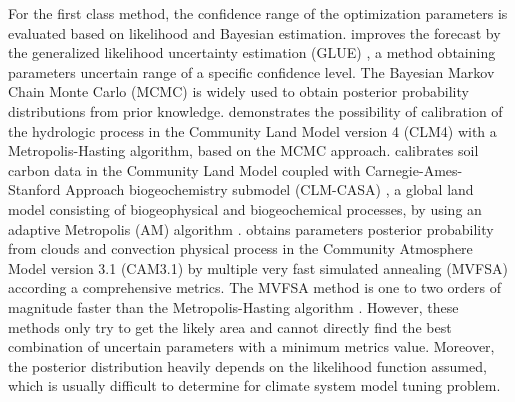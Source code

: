 \documentclass[gmd, manuscript]{copernicus}
\begin{document}
For the first class method, the confidence range of the optimization parameters is evaluated based on likelihood and Bayesian estimation. \cite{cameron1999flood} improves the forecast by the generalized likelihood uncertainty estimation (GLUE) \citep{beven1992future}, a method obtaining parameters uncertain range of a specific confidence level. The Bayesian Markov Chain Monte Carlo (MCMC) \citep{gilks2005markov} is widely used to obtain posterior probability distributions from prior knowledge. \cite{sun2013inverse} demonstrates the possibility of calibration of the hydrologic process in the Community Land Model version 4 (CLM4) \citep{lawrence2011parameterization,lawrence2007representing} with a Metropolis-Hasting algorithm, based on the MCMC approach. \cite{hararuk2014evaluation} calibrates soil carbon data in the  Community Land Model coupled with Carnegie-Ames-Stanford Approach biogeochemistry submodel (CLM-CASA) \citep{oleson2004technical,oleson2008improvements,parton1993observations}, a global land model consisting of biogeophysical and biogeochemical processes, by using an adaptive Metropolis (AM) algorithm \citep{gilks2005markov}. \cite{jackson2008error} obtains parameters posterior probability from clouds and convection physical process in the Community Atmosphere Model version 3.1 (CAM3.1) \citep{collins2004description} by multiple very fast simulated annealing (MVFSA) according a comprehensive metrics. The MVFSA method is one to two orders of magnitude faster than the Metropolis-Hasting algorithm \citep{jackson2004efficient}. However, these methods only try to get the likely area and cannot directly find the best combination of uncertain parameters with a minimum metrics value. Moreover, the posterior distribution heavily depends on the likelihood function assumed, which is usually difficult to determine for climate system model tuning problem.
\end{document}
